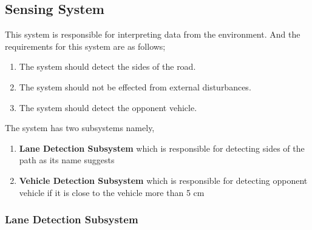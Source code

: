 \documentclass[a4paper,12pt]{article}
\begin{document}




\subsection{Sensing System}


This system is responsible for interpreting data from the environment. And the requirements for this system are as follows;

\begin{enumerate}

\item The system should detect the sides of the road.

\item The system should not be effected from external disturbances.

\item The system should detect the opponent vehicle.

\end{enumerate}	

The system has two subsystems namely, 


\begin{enumerate}

\item \textbf{Lane Detection Subsystem} which is responsible for detecting sides of the path as its name suggests

\item \textbf{Vehicle Detection Subsystem} which is responsible for detecting opponent vehicle if it is close to the vehicle more than 5 cm

\end{enumerate}



\subsubsection{Lane Detection Subsystem}\label{sec:LaneDetectionSubsystem}
\end{document}
